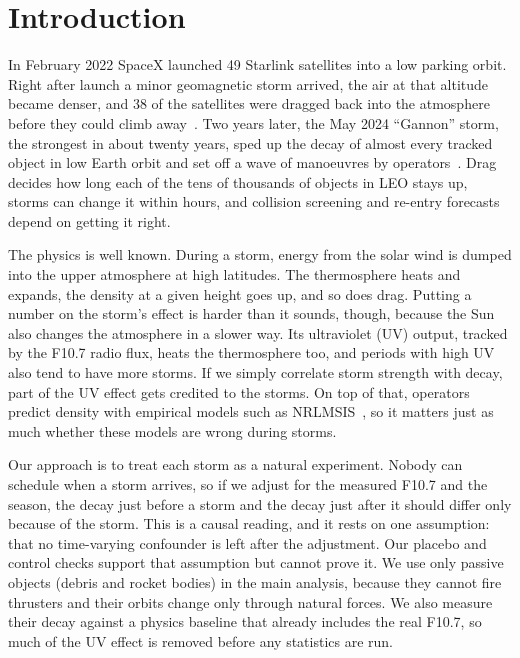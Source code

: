 \section{Introduction}
\label{sec:intro}

In February 2022 SpaceX launched 49 Starlink satellites into a low parking orbit. Right after launch a
minor geomagnetic storm arrived, the air at that altitude became denser, and 38 of the
satellites were dragged back into the atmosphere before they could climb
away~\cite{fang2022starlink}. Two years later, the May 2024 ``Gannon'' storm, the strongest in
about twenty years, sped up the decay of almost every tracked object in low Earth orbit and set
off a wave of manoeuvres by operators~\cite{parker2024gannon}. Drag decides how long each of
the tens of thousands of objects in LEO stays up, storms can change it within hours, and
collision screening and re-entry forecasts depend on getting it right.

The physics is well known. During a storm, energy from the solar wind is dumped into the upper
atmosphere at high latitudes. The thermosphere heats and expands, the density at a given height
goes up, and so does drag. Putting a number on the storm's effect is harder than it sounds,
though, because the Sun also changes the atmosphere in a slower way. Its ultraviolet (UV)
output, tracked by the F10.7 radio flux, heats the thermosphere too, and periods with high UV
also tend to have more storms. If we simply correlate storm strength with decay, part of the UV
effect gets credited to the storms. On top of that, operators predict density with empirical
models such as NRLMSIS~\cite{picone2002nrlmsise,emmert2021nrlmsis,emmert2022msis21}, so it
matters just as much whether these models are wrong during storms.

Our approach is to treat each storm as a natural experiment. Nobody can schedule when a storm
arrives, so if we adjust for the measured F10.7 and the season, the decay just before a storm
and the decay just after it should differ only because of the storm. This is a causal reading,
and it rests on one assumption: that no time-varying confounder is left after the adjustment.
Our placebo and control checks support that assumption but cannot prove it. We use only passive
objects (debris and rocket bodies) in the main analysis, because they cannot fire thrusters and
their orbits change only through natural forces. We also measure their decay against a physics
baseline that already includes the real F10.7, so much of the UV effect is removed before any
statistics are run.

